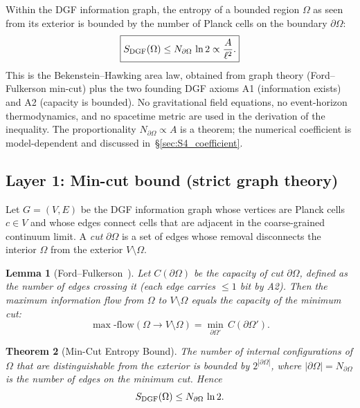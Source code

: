 \documentclass[aps,prd,twocolumn,superscriptaddress,nofootinbib,floatfix]{revtex4-2}
\newtheorem{theorem}{Theorem}[section]
\newtheorem{lemma}[theorem]{Lemma}
\begin{document}
Within the DGF information graph, the entropy of a bounded region $\Omega$
as seen from its exterior is bounded by the number of Planck cells on the
boundary $\partial\Omega$:
\begin{equation}
  \boxed{
  S_{\rm DGF}(\Omega) \le N_{\partial\Omega}\,\ln 2
  \propto \frac{A}{\ell^2}.
  }
  \label{eq:S4_main}
\end{equation}
This is the Bekenstein--Hawking area law, obtained from graph theory
(Ford--Fulkerson min-cut) plus the two founding DGF axioms A1 (information
exists) and A2 (capacity is bounded).  No gravitational field equations,
no event-horizon thermodynamics, and no spacetime metric are used in the
derivation of the inequality.  The proportionality $N_{\partial\Omega}\propto A$
is a theorem; the numerical coefficient is model-dependent and discussed
in~\S\ref{sec:S4_coefficient}.

\subsection{Layer 1: Min-cut bound (strict graph theory)}

\label{sec:S4_layer1}

Let $G=(V,E)$ be the DGF information graph whose vertices are Planck cells
$c\in V$ and whose edges connect cells that are adjacent in the
coarse-grained continuum limit.  A \emph{cut} $\partial\Omega$ is a set of
edges whose removal disconnects the interior $\Omega$ from the exterior
$V\setminus\Omega$.

\begin{lemma}[Ford--Fulkerson~\cite{ford1956}]
Let $C(\partial\Omega)$ be the capacity of cut $\partial\Omega$, defined as
the number of edges crossing it (each edge carries $\le 1$ bit by A2).
Then the maximum information flow from $\Omega$ to $V\setminus\Omega$ equals
the capacity of the minimum cut:
\begin{equation}
  \max\text{-flow}(\Omega\to V\setminus\Omega)
  = \min_{\partial\Omega'}\,C(\partial\Omega').
  \label{eq:S4_ff}
\end{equation}
\end{lemma}

\begin{theorem}[Min-Cut Entropy Bound]
\label{thm:mincut}
The number of internal configurations of $\Omega$ that are distinguishable
from the exterior is bounded by $2^{|\partial\Omega|}$, where
$|\partial\Omega| = N_{\partial\Omega}$ is the number of edges on the
minimum cut.  Hence
\begin{equation}
  S_{\rm DGF}(\Omega) \le N_{\partial\Omega}\,\ln 2.
  \label{eq:S4_mincut}
\end{equation}
\end{theorem}
\end{document}

